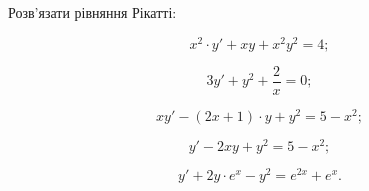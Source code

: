 Розв'язати рівняння Рікатті:
\begin{multicols}{2}
	\begin{problem}
		\[x^2\cdot y' + xy +x^2y^2=4;\]
	\end{problem}

	\begin{problem}
		\[3y'+y^2+\frac2x=0;\]
	\end{problem}

	\begin{problem}
		\[xy'-(2x+1)\cdot y+y^2=5-x^2;\]
	\end{problem}

	\begin{problem}
		\[y'-2xy+y^2=5-x^2;\]
	\end{problem}
	
	\begin{problem}
		\[y'+2y \cdot e^x - y^2 = e^{2x} + e^x.\]
	\end{problem}
\end{multicols}